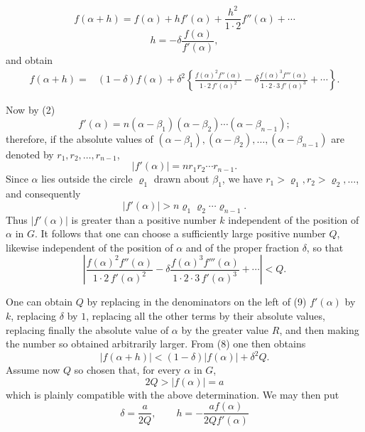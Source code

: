 
\begin{equation}
 f(\alpha+h)=f(\alpha)+h f'(\alpha)+\frac{h^2}{1\cdot2}f''(\alpha)+\cdots
\tag{6}
\end{equation}
\begin{equation}
 h=-\delta\frac{f(\alpha)}{f'(\alpha)},
\tag{7}
\end{equation}
and obtain
\begin{align}
 f(\alpha+h)={}&(1-\delta)f(\alpha)
 +\delta^2\left\{\frac{f(\alpha)^2 f''(\alpha)}{1\cdot2\,f'(\alpha)^2}
 -\delta\frac{f(\alpha)^3 f'''(\alpha)}{1\cdot2\cdot3\,f'(\alpha)^3}+\cdots\right\}.
\tag{8}
\end{align}

Now by (2)
\[
 f'(\alpha)=n(\alpha-\beta_1)(\alpha-\beta_2)\cdots(\alpha-\beta_{n-1});
\]
therefore, if the absolute values of $(\alpha-\beta_1),(\alpha-\beta_2),
\ldots,(\alpha-\beta_{n-1})$ are denoted by $r_1,r_2,
\ldots,r_{n-1}$,
\[
 |f'(\alpha)|=nr_1r_2\cdots r_{n-1}.
\]
Since $\alpha$ lies outside the circle $\varrho_1$ drawn about $\beta_1$, we have $r_1>\varrho_1,r_2>\varrho_2,\ldots$, and consequently
\[
 |f'(\alpha)|>n\varrho_1\varrho_2\cdots\varrho_{n-1}.
\]
Thus $|f'(\alpha)|$ is greater than a positive number $k$ independent of the position of $\alpha$ in $G$. It follows that one can choose a sufficiently large positive number $Q$, likewise independent of the position of $\alpha$ and of the proper fraction $\delta$, so that
\begin{equation}
 \left|\frac{f(\alpha)^2f''(\alpha)}{1\cdot2\,f'(\alpha)^2}
 -\delta\frac{f(\alpha)^3f'''(\alpha)}{1\cdot2\cdot3\,f'(\alpha)^3}+\cdots\right|<Q .
\tag{9}
\end{equation}

One can obtain $Q$ by replacing in the denominators on the left of (9) $f'(\alpha)$ by $k$, replacing $\delta$ by $1$, replacing all the other terms by their absolute values, replacing finally the absolute value of $\alpha$ by the greater value $R$, and then making the number so obtained arbitrarily larger. From (8) one then obtains
\begin{equation}
 |f(\alpha+h)|<(1-\delta)|f(\alpha)|+\delta^2Q.
\tag{10}
\end{equation}
Assume now $Q$ so chosen that, for every $\alpha$ in $G$,
\[
 2Q>|f(\alpha)|=a
\]
which is plainly compatible with the above determination. We may then put
\[
 \delta=\frac{a}{2Q},\qquad
 h=-\frac{a f(\alpha)}{2Q f'(\alpha)}
\]
